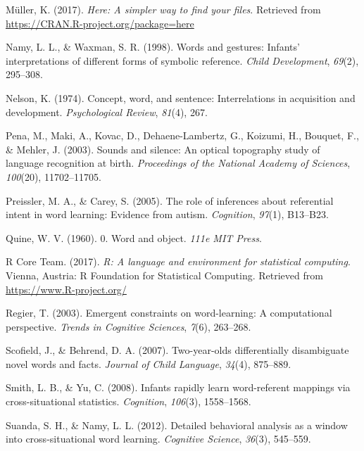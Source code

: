 \documentclass[english,floatsintext,man]{apa6}
\theoremstyle{definition}
\theoremstyle{definition}
\theoremstyle{definition}
\theoremstyle{remark}
\begin{document}
\leavevmode\hypertarget{ref-R-here}{}%
Müller, K. (2017). \emph{Here: A simpler way to find your files}.
Retrieved from \url{https://CRAN.R-project.org/package=here}

\leavevmode\hypertarget{ref-namy1998words}{}%
Namy, L. L., \& Waxman, S. R. (1998). Words and gestures: Infants'
interpretations of different forms of symbolic reference. \emph{Child
Development}, \emph{69}(2), 295--308.

\leavevmode\hypertarget{ref-nelson1974concept}{}%
Nelson, K. (1974). Concept, word, and sentence: Interrelations in
acquisition and development. \emph{Psychological Review}, \emph{81}(4),
267.

\leavevmode\hypertarget{ref-pena2003sounds}{}%
Pena, M., Maki, A., Kovac, D., Dehaene-Lambertz, G., Koizumi, H.,
Bouquet, F., \& Mehler, J. (2003). Sounds and silence: An optical
topography study of language recognition at birth. \emph{Proceedings of
the National Academy of Sciences}, \emph{100}(20), 11702--11705.

\leavevmode\hypertarget{ref-preissler2005role}{}%
Preissler, M. A., \& Carey, S. (2005). The role of inferences about
referential intent in word learning: Evidence from autism.
\emph{Cognition}, \emph{97}(1), B13--B23.

\leavevmode\hypertarget{ref-quine19600}{}%
Quine, W. V. (1960). 0. Word and object. \emph{111e MIT Press}.

\leavevmode\hypertarget{ref-R-base}{}%
R Core Team. (2017). \emph{R: A language and environment for statistical
computing}. Vienna, Austria: R Foundation for Statistical Computing.
Retrieved from \url{https://www.R-project.org/}

\leavevmode\hypertarget{ref-regier2003emergent}{}%
Regier, T. (2003). Emergent constraints on word-learning: A
computational perspective. \emph{Trends in Cognitive Sciences},
\emph{7}(6), 263--268.

\leavevmode\hypertarget{ref-scofield2007two}{}%
Scofield, J., \& Behrend, D. A. (2007). Two-year-olds differentially
disambiguate novel words and facts. \emph{Journal of Child Language},
\emph{34}(4), 875--889.

\leavevmode\hypertarget{ref-smith2008infants}{}%
Smith, L. B., \& Yu, C. (2008). Infants rapidly learn word-referent
mappings via cross-situational statistics. \emph{Cognition},
\emph{106}(3), 1558--1568.

\leavevmode\hypertarget{ref-suanda2012detailed}{}%
Suanda, S. H., \& Namy, L. L. (2012). Detailed behavioral analysis as a
window into cross-situational word learning. \emph{Cognitive Science},
\emph{36}(3), 545--559.
\end{document}
